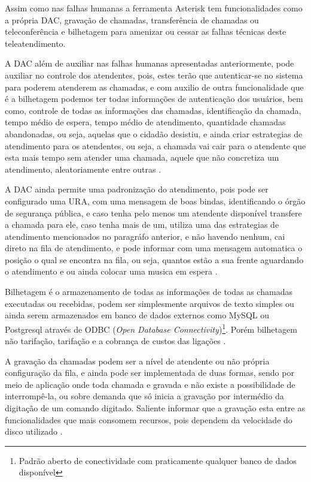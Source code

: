 Assim como nas falhas humanas a ferramenta Asterisk tem funcionalidades como a própria DAC, gravação de chamadas, transferência de chamadas ou teleconferência e bilhetagem para amenizar ou cessar as falhas técnicas deste teleatendimento.

A DAC além de auxiliar nas falhas humanas apresentadas anteriormente, pode auxiliar no controle dos atendentes, pois, estes terão que autenticar-se no sistema para poderem atenderem as chamadas, e com auxilio de outra funcionalidade que é a bilhetagem podemos ter todas informações de autenticação dos usuários, bem como, controle de todas as informações das chamadas, identificação da chamada, tempo médio de espera, tempo médio de atendimento, quantidade chamadas abandonadas, ou seja, aquelas que o cidadão desistiu, e ainda criar estrategias de atendimento para os atendentes, ou seja, a chamada vai cair para o atendente que esta mais tempo sem atender uma chamada, aquele que não concretiza um atendimento, aleatoriamente entre outras \cite{books/daglib/0018909}.

A DAC ainda permite uma padronização do atendimento, pois pode ser configurado uma URA, com uma mensagem de boas bindas, identificando o órgão de segurança pública, e caso tenha pelo menos um atendente disponível transfere a chamada para ele, caso tenha mais de um, utiliza uma das estrategias de atendimento mencionados no paragráfo anterior, e não havendo nenhum, cai direto na fila de atendimento, e pode informar com uma mensagem automatica o posição o qual se encontra na fila, ou seja, quantos estão a sua frente aguardando o atendimento e ou ainda colocar uma musica em espera \cite{flavioeduardoandredade2005}.

Bilhetagem é o armazenamento de todas as informações de todas as chamadas executadas ou recebidas, podem ser simplesmente arquivos de texto simples ou ainda serem armazenados em banco de dados externos como MySQL ou Postgresql através de ODBC (\textit{Open Database Connectivity})\footnote{Padrão aberto de conectividade com praticamente qualquer banco de dados disponível}. Porém bilhetagem não tarifação, tarifação e a cobrança de custos das ligações \cite{alexandrekeller2014}.

A gravação da chamadas podem ser a nível de atendente ou não própria configuração da fila, e ainda pode ser implementada de duas formas, sendo por meio de aplicação onde toda chamada e gravada e não existe a possibilidade de interrompê-la, ou sobre demanda que só inicia a gravação por intermédio da digitação de um comando digitado. Saliente informar que a gravação esta entre as funcionalidades que mais consomem recursos, pois dependem da velocidade do disco utilizado \cite{alexandrekeller2014}.

